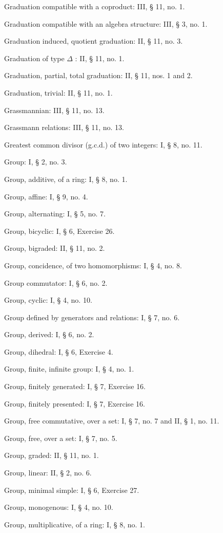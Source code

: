 Graduation compatible with a coproduct: III, § 11, no. 1.

Graduation compatible with an algebra structure: III, § 3, no. 1.

Graduation induced, quotient graduation: II, § 11, no. 3.

Graduation of type \(\Delta\) : II, § 11, no. 1.

Graduation, partial, total graduation: II, § 11, nos. 1 and 2.

Graduation, trivial: II, § 11, no. 1.

Grassmannian: III, § 11, no. 13.

Grassmann relations: III, § 11, no. 13.

Greatest common divisor (g.c.d.) of two integers: I, § 8, no. 11.

Group: I, § 2, no. 3.

Group, additive, of a ring: I, § 8, no. 1.

Group, affine: I, § 9, no. 4.

Group, alternating: I, § 5, no. 7.

Group, bicyclic: I, § 6, Exercise 26.

Group, bigraded: II, § 11, no. 2.

Group, concidence, of two homomorphisms: I, § 4, no. 8.

Group commutator: I, § 6, no. 2.

Group, cyclic: I, § 4, no. 10.

Group defined by generators and relations: I, § 7, no. 6.

Group, derived: I, § 6, no. 2.

Group, dihedral: I, § 6, Exercise 4.

Group, finite, infinite group: I, § 4, no. 1.

Group, finitely generated: I, § 7, Exercise 16.

Group, finitely presented: I, § 7, Exercise 16.

Group, free commutative, over a set: I, § 7, no. 7 and II, § 1, no. 11.

Group, free, over a set: I, § 7, no. 5.

Group, graded: II, § 11, no. 1.

Group, linear: II, § 2, no. 6.

Group, minimal simple: I, § 6, Exercise 27.

Group, monogenous: I, § 4, no. 10.

Group, multiplicative, of a ring: I, § 8, no. 1.

